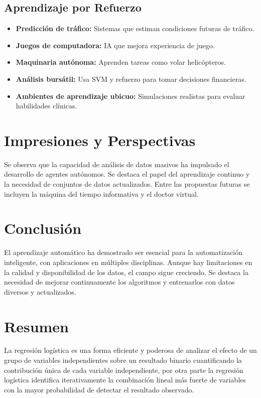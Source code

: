 \documentclass[12pt]{article}
\begin{document}
\subsection{Aprendizaje por Refuerzo}
\begin{itemize}
  \item \textbf{Predicci\'on de tr\'afico:} Sistemas que estiman condiciones futuras de tr\'afico.
  \item \textbf{Juegos de computadora:} IA que mejora experiencia de juego.
  \item \textbf{Maquinaria aut\'onoma:} Aprenden tareas como volar helic\'opteros.
  \item \textbf{An\'alisis burs\'atil:} Usa SVM y refuerzo para tomar decisiones financieras.
  \item \textbf{Ambientes de aprendizaje ubicuo:} Simulaciones realistas para evaluar habilidades cl\'inicas.
\end{itemize}

\section{Impresiones y Perspectivas}
Se observa que la capacidad de an\'alisis de datos masivos ha impulsado el desarrollo de agentes aut\'onomos. Se destaca el papel del aprendizaje continuo y la necesidad de conjuntos de datos actualizados. Entre las propuestas futuras se incluyen la m\'aquina del tiempo informativa y el doctor virtual.

\section{Conclusi\'on}
El aprendizaje autom\'atico ha demostrado ser esencial para la automatizaci\'on inteligente, con aplicaciones en m\'ultiples disciplinas. Aunque hay limitaciones en la calidad y disponibilidad de los datos, el campo sigue creciendo. Se destaca la necesidad de mejorar continuamente los algoritmos y entrenarlos con datos diversos y actualizados.


\section{Resumen}

La regresi\'on log\'istica es una forma eficiente y poderosa de analizar el efecto de un grupo de variables independientes sobre un resultado binario cuantificando la contribuci\'on \'unica de cada variable independiente, por otra parte la regresi\'on log\'istica identifica iterativamente la combinaci\'on lineal m\'as fuerte de variables con la mayor probabilidad de detectar el resultado observado.
\end{document}
